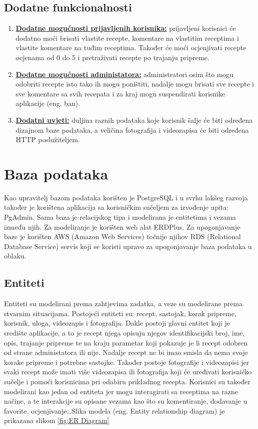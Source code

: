 \documentclass[times, utf8, zavrsni]{fer}
\begin{document}
\section{Dodatne funkcionalnosti}
\begin{enumerate}
      \item \textbf{\underline{Dodatne mogućnosti prijavljenih korisnika:}} prijavljeni korisnici će
            dodatno moći brisati vlastite recepte, komentare na vlastitim receptima i vlastite komentare
            na tuđim receptima. Također će moći ocjenjivati recepte ocjenama od 0 do 5 i pretraživati
            recepte po trajanju pripreme.
      \item \textbf{\underline{Dodatne mogućnosti administatora:}} administratori osim što mogu odobriti
            recepte isto tako ih mogu poništiti, nadalje mogu brisati sve recepte i sve komentare sa svih recepata
            i za kraj mogu suspendirati korisnike aplikacije (eng. ban).
      \item \textbf{\underline{Dodatni uvjeti:}} duljina raznih podataka koje korisnik šalje će biti
            određena dizajnom baze podataka, a veličina fotografija i videozapisa će biti određena
            HTTP poslužiteljem.
\end{enumerate}
\chapter{Baza podataka}
Kao upravitelj bazom podataka korišten je PostgreSQL i u svrhu lakšeg razvoja također
je korištena aplikacija sa korisničkim sučeljem za izvođenje upita: PgAdmin.
Sama baza je relacijskog tipa i modelirana je entitetima i vezama između njih.
Za modeliranje je korišten web alat ERDPlus. Za upogonjavanje baze je korišten AWS (Amazon Web Services)
točnije njihov RDS (Relational Database Service) servis koji se koristi upravo za upogonjavanje baza podataka u oblaku.

\section{Entiteti}
Entiteti su modelirani prema zahtjevima zadatka, a veze su modelirane prema stvarnim situacijama.
Postojeći entiteti su: recept, sastojak, korak pripreme, korisnik, uloga, videozapis i
fotografija. Dakle postoji glavni entitet koji je središte aplikacije, a to je recept
njega opisuju njegov identifikacijski broj, ime, opis, trajanje pripreme
te na kraju parametar koji pokazuje je li recept odobren od strane administatora ili nije.
Nadalje recept ne bi imao smisla da nema svoje korake pripreme i potrebne sastojke.
Također postoje fotografije i videozapisi jer svaki recept može imati
više videozapisa ili fotografija koji će uređivati korisničko sučelje
i pomoći korisnicima pri odabiru prikladnog recepta.
Korisnici su također modelirani kao jedan od entiteta jer mogu interagirati sa receptima
na razne načine, a te interakcije su opisane vezama kao što su komentiranje,
dodavanje u favorite, ocjenjivanje\dots Slika modela (eng. Entity relationship diagram)
je prikazana slikom \ref{fig:ER Diagram}
\end{document}
